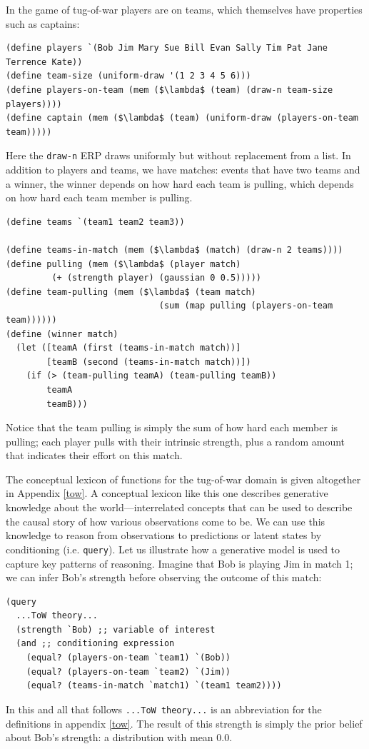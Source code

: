 \documentclass[pdfextras]{handbook}
\begin{document}
In the game of tug-of-war players are on teams, which themselves have properties such as captains:
\begin{lstlisting}[mathescape]
(define players `(Bob Jim Mary Sue Bill Evan Sally Tim Pat Jane Terrence Kate))
(define team-size (uniform-draw '(1 2 3 4 5 6)))
(define players-on-team (mem ($\lambda$ (team) (draw-n team-size players))))
(define captain (mem ($\lambda$ (team) (uniform-draw (players-on-team team)))))
\end{lstlisting}
Here the \lstinline{draw-n} ERP draws uniformly but without replacement from a list.
%
In addition to players and teams, we have matches: events that have two teams and a winner, the winner depends on how hard each team is pulling, which depends on how hard each team member is pulling.
\begin{lstlisting}[mathescape]
(define teams `(team1 team2 team3))

(define teams-in-match (mem ($\lambda$ (match) (draw-n 2 teams))))
(define pulling (mem ($\lambda$ (player match) 
         (+ (strength player) (gaussian 0 0.5)))))
(define team-pulling (mem ($\lambda$ (team match) 
                              (sum (map pulling (players-on-team team))))))
(define (winner match) 
  (let ([teamA (first (teams-in-match match))]
        [teamB (second (teams-in-match match))])
    (if (> (team-pulling teamA) (team-pulling teamB))
        teamA
        teamB)))
\end{lstlisting}
Notice that the team pulling is simply the sum of how hard each member is pulling; each player pulls with their intrinsic strength, plus a random amount that indicates their effort on this match. 
 
The conceptual lexicon of functions for the tug-of-war domain is given altogether in Appendix \ref{tow}.
A conceptual lexicon like this one describes generative knowledge about the world---interrelated concepts that can be used to describe the causal story of how various observations come to be. 
%
We can use this knowledge to reason from observations to predictions or latent states by conditioning (i.e. \lstinline{query}). 
Let us illustrate how a generative model is used to capture key patterns of reasoning. 
Imagine that Bob is playing Jim in match 1; we can infer Bob's strength before observing the outcome of this match:
\begin{lstlisting}[mathescape]
(query
  ...ToW theory...
  (strength `Bob) ;; variable of interest
  (and ;; conditioning expression 
    (equal? (players-on-team `team1) `(Bob))
    (equal? (players-on-team `team2) `(Jim))
    (equal? (teams-in-match `match1) `(team1 team2))))
\end{lstlisting}
In this and all that follows \lstinline{...ToW theory...} is an abbreviation for the definitions in appendix \ref{tow}. 
The result of this strength is simply the prior belief about Bob's strength: a distribution with mean 0.0.
\end{document}
